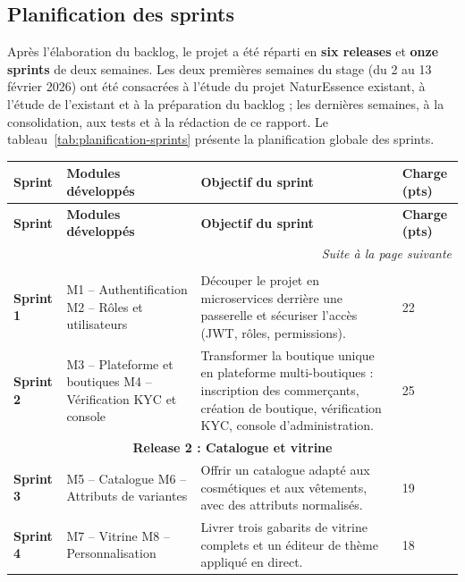 \subsection{Planification des sprints}
Après l'élaboration du backlog, le projet a été réparti en \textbf{six releases} et \textbf{onze sprints} de deux semaines. Les deux premières semaines du stage (du 2 au 13 février 2026) ont été consacrées à l'étude du projet NaturEssence existant, à l'étude de l'existant et à la préparation du backlog ; les dernières semaines, à la consolidation, aux tests et à la rédaction de ce rapport.\newline
Le tableau~\ref{tab:planification-sprints} présente la planification globale des sprints.
\begin{longtable}{|p{1.6cm}|p{4.2cm}|p{6.5cm}|p{1.6cm}|}
\hline
\textbf{Sprint} & \textbf{Modules développés} & \textbf{Objectif du sprint} & \textbf{Charge (pts)} \\
\hline
\endfirsthead
\hline
\textbf{Sprint} & \textbf{Modules développés} & \textbf{Objectif du sprint} & \textbf{Charge (pts)} \\
\hline
\endhead
\hline \multicolumn{4}{r}{\textit{Suite à la page suivante}} \\
\endfoot
\hline
\endlastfoot
\multicolumn{4}{|c|}{\textbf{Release 1 : Fondations de la plateforme}} \\
\hline
\textbf{Sprint 1} & M1 -- Authentification \newline M2 -- Rôles et utilisateurs & Découper le projet en microservices derrière une passerelle et sécuriser l'accès (JWT, rôles, permissions). & 22 \\
\hline
\textbf{Sprint 2} & M3 -- Plateforme et boutiques \newline M4 -- Vérification KYC et console & Transformer la boutique unique en plateforme multi-boutiques : inscription des commerçants, création de boutique, vérification KYC, console d'administration. & 25 \\
\hline
\multicolumn{4}{|c|}{\textbf{Release 2 : Catalogue et vitrine}} \\
\hline
\textbf{Sprint 3} & M5 -- Catalogue \newline M6 -- Attributs de variantes & Offrir un catalogue adapté aux cosmétiques et aux vêtements, avec des attributs normalisés. & 19 \\
\hline
\textbf{Sprint 4} & M7 -- Vitrine \newline M8 -- Personnalisation & Livrer trois gabarits de vitrine complets et un éditeur de thème appliqué en direct. & 18 \\

\end{longtable}
